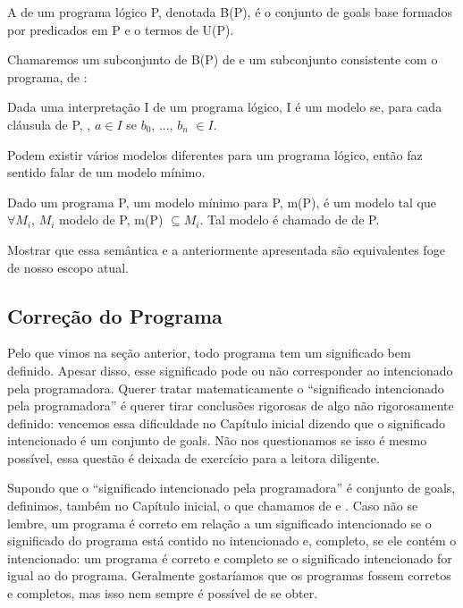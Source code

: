 \begin{definition} A  de um programa lógico P, denotada B(P), é o conjunto de goals base formados por predicados em P e o termos de U(P).
\end{definition}

  Chamaremos um subconjunto de B(P) de  e um subconjunto consistente com o programa, de :

\begin{definition} Dada uma interpretação I de um programa lógico, I é um modelo se, para cada cláusula de P, , $a \in I$ se $b_0$, ..., $b_n$ $\in I$.
\end{definition}

 Podem existir vários modelos diferentes para um programa lógico, então faz sentido falar de um modelo mínimo.

\begin{definition} Dado um programa P, um modelo mínimo para P, m(P), é um modelo tal que $\forall M_i$, $M_i$ modelo de P, m(P) $\subseteq M_i$. Tal modelo é chamado de  de P.
\end{definition}

Mostrar que essa semântica e a anteriormente apresentada são equivalentes foge de nosso escopo atual.

\subsection{Correção do Programa}

Pelo que vimos na seção anterior, todo programa tem um significado bem definido. Apesar disso, esse significado pode ou não corresponder ao intencionado pela programadora. Querer tratar matematicamente o ``significado intencionado pela programadora'' é querer tirar conclusões rigorosas de algo não rigorosamente definido: vencemos essa dificuldade no Capítulo inicial dizendo que o significado intencionado é um conjunto de goals. Não nos questionamos se
isso é mesmo possível, essa questão é deixada de exercício para a leitora diligente.

Supondo que o ``significado intencionado pela programadora'' é conjunto de goals, definimos, também no Capítulo inicial, o que chamamos de  e . Caso não se lembre, um programa é correto em relação a um significado intencionado se o significado do programa está contido no intencionado e, completo, se ele contém o intencionado: um programa é correto e completo se o significado intencionado for igual ao do programa.
Geralmente gostaríamos que os programas fossem corretos e completos, mas isso nem sempre é possível de se obter.

